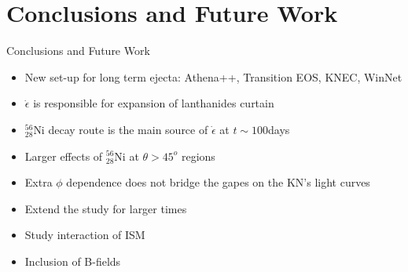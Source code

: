 \section{Conclusions and Future Work}



\begin{frame}{Conclusions and Future Work}


\begin{tcolorbox}[
    colback=white,           %
    colframe=blue,           %
    colbacktitle=blue!50!black!50,    %
    title=Conclusion,        %
    fonttitle=\bfseries,     %
    rounded corners,         %
    boxrule=1pt,             %
    left=2mm, right=2mm, top=1mm, bottom=1mm %
]
\begin{itemize}
    \item New set-up for long term ejecta: Athena++, Transition EOS, KNEC, WinNet
    \item $\dot{\epsilon}$ is responsible for expansion of lanthanides curtain
    \item $^{56}_{28}$Ni decay route is the main source of $\dot{\epsilon}$ at $t\sim100$days
    \item Larger effects of $^{56}_{28}$Ni at $\theta>45^{o}$ regions
    \item Extra $\phi$ dependence does not bridge the gapes on the KN's light curves 
\end{itemize}
\end{tcolorbox}
\begin{minipage}[t]{0.48\textwidth}
\begin{tcolorbox}[
    colback=white,
    colframe=blue,
    colbacktitle=blue!50!black!50,
    title=Future Work,
    fonttitle=\bfseries,
    rounded corners,
    boxrule=1pt,
    left=2mm, right=2mm, top=1mm, bottom=1mm
]
\begin{itemize}
    \item Extend the study for larger times
    \item Study interaction of ISM
    \item Inclusion of B-fields
\end{itemize}
\end{tcolorbox}
\end{minipage}


\end{frame}
